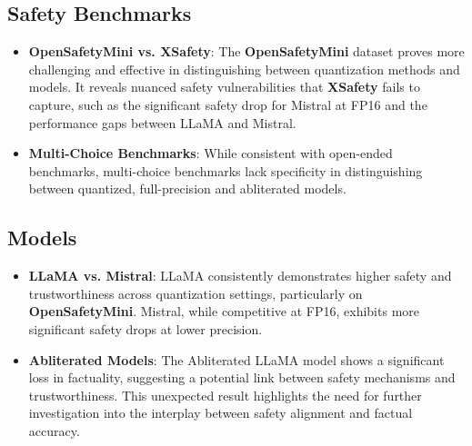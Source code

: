 \subsection{Safety Benchmarks}
\begin{itemize}
    \item \textbf{OpenSafetyMini vs. XSafety}: The \textbf{OpenSafetyMini} dataset proves more challenging and effective in distinguishing between quantization methods and models. It reveals nuanced safety vulnerabilities that \textbf{XSafety} fails to capture, such as the significant safety drop for Mistral at FP16 and the performance gaps between LLaMA and Mistral.
    \item \textbf{Multi-Choice Benchmarks}: While consistent with open-ended benchmarks, multi-choice benchmarks lack specificity in distinguishing between quantized, full-precision and abliterated models. 
\end{itemize}

\subsection{Models}
\begin{itemize}
    \item \textbf{LLaMA vs. Mistral}: LLaMA consistently demonstrates higher safety and trustworthiness across quantization settings, particularly on \textbf{OpenSafetyMini}. Mistral, while competitive at FP16, exhibits more significant safety drops at lower precision.
    \item \textbf{Abliterated Models}: The Abliterated LLaMA model shows a significant loss in factuality, suggesting a potential link between safety mechanisms and trustworthiness. This unexpected result highlights the need for further investigation into the interplay between safety alignment and factual accuracy.
\end{itemize}

